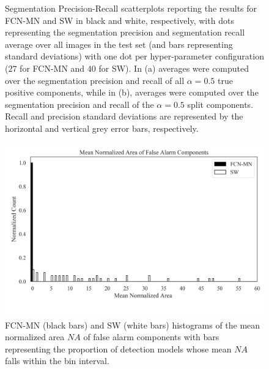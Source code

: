 \documentclass[a4paper,authoryear,review]{elsarticle}
\begin{document}
\begin{figure}
\begin{subfigure}[b]{0.97\textwidth}
			\caption{}
			\label{fig:Figure5-b}
		\end{subfigure}
		\caption{
			Segmentation Precision-Recall scatterplots reporting the results for FCN-MN and SW in black and white, respectively, with dots representing the segmentation precision and segmentation recall average over all images in the test set (and bars representing standard deviations) with one dot per hyper-parameter configuration ($27$ for FCN-MN and $40$ for SW). In (a) averages were computed over the segmentation precision and recall of all $\alpha=0.5$ true positive components, while in (b), averages were computed over the segmentation precision and recall of the $\alpha=0.5$ split components. Recall and precision standard deviations are represented by the horizontal and vertical grey error bars, respectively.
		}%
		\label{fig:Figure5}%
	\end{figure}
	
	
	
	
	\begin{figure}%
		\centering
		\includegraphics[width=\textwidth]{figures/Figure6.png}%
		\caption{
			FCN-MN (black bars) and SW (white bars) histograms of the mean normalized area $NA$ of false alarm components with bars representing the proportion of detection models whose mean $NA$ falls within the bin interval.
		}
		\label{fig:Figure6}
	\end{figure}
	
\end{document}
